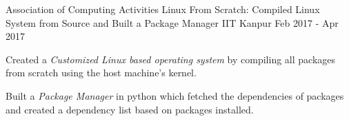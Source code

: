 \begin{cventries}
  \cventry
    {Association of Computing Activities} %
    {Linux From Scratch: Compiled Linux System from Source and Built a Package Manager} %
    {IIT Kanpur} %
    {Feb 2017 - Apr 2017} %
    {
      \begin{cvitems} %
        \item {Created a \textit{Customized Linux based operating system} by compiling all packages from scratch using the host machine's kernel.}
        \item {Built a \textit{Package Manager} in python which fetched the dependencies of packages and created a dependency list based on packages installed.} 
      \end{cvitems}
    }

\end{cventries}
